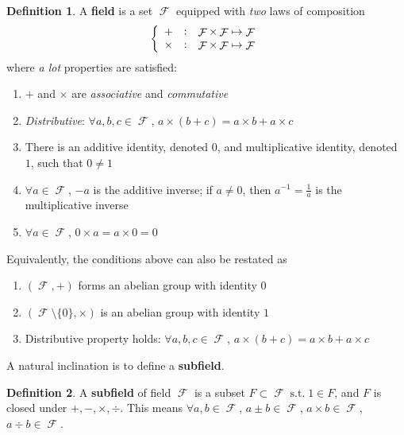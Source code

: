\documentclass[11pt]{amsart} %
\theoremstyle{definition}
\newtheorem{definition}{Definition}[section]
\theoremstyle{definition}
\DeclareMathOperator{\FF}{\mathcal{F}}
\DeclareMathOperator{\suchthat}{\text{ s.t. }}
\numberwithin{equation}{section}
\begin{document}
\begin{definition}
	\label{deffield}
	A \textbf{field} is a set $\FF$ equipped with \textit{two} laws of composition
	$$\left\{ \begin{array}{c c l}
	+ & : & \FF \times \FF \mapsto \FF \\
		\times & : & \FF \times \FF \mapsto \FF 
	\end{array} \right.$$
	where \textit{a lot} properties are satisfied:
	\begin{enumerate}%
		\item $+ $ and $\times$ are \textit{associative} and \textit{commutative}
		\item \textit{Distributive}: $\forall a,b,c\in \FF$, $a\times(b+c) = a\times b +  a \times c$
		\item There is an additive identity, denoted $0$, and multiplicative identity, denoted $1$, such that $0\neq 1$
		\item $\forall a \in \FF$, $-a$ is the additive inverse; if $a\neq 0$, then $a^{-1} = \frac{1}{a}$ is the multiplicative inverse
		\item $\forall a \in \FF$, $0\times a = a \times 0 = 0$
	\end{enumerate}

	Equivalently, the conditions above can also be restated as
	\begin{enumerate}%
		\item $(\FF,+)$ forms an abelian group with identity $0$
		\item $(\FF\setminus \{0\}, \times )$ is an abelian group with identity $1$
		\item Distributive property holds: $\forall a,b,c\in \FF$, $a\times(b+c) = a\times b +  a \times c$
	\end{enumerate}
\end{definition}

A natural inclination is to define a \textbf{subfield}.

\begin{definition}
	A \textbf{subfield} of field $\FF$ is a subset $F \subset \FF \suchthat 1 \in F$, and $F$ is closed under $+,-,\times,\div$. This means $\forall a,b\in \FF$, $a \pm b \in \FF$, $a\times b \in \FF$, $a \div b \in \FF$.
\end{definition}
\end{document}

